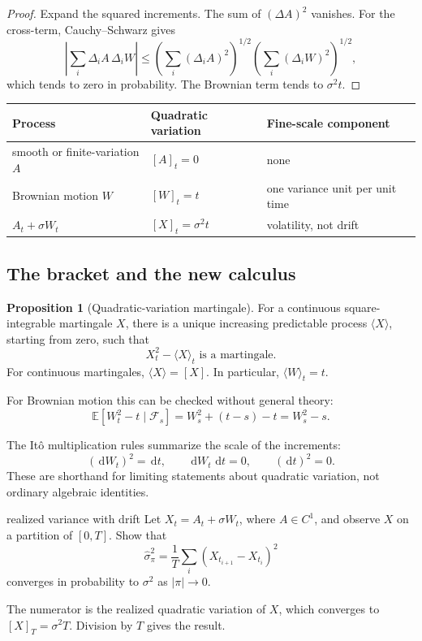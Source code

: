 \documentclass[10pt]{article}
\newcommand{\E}{\mathbb E}
\newcommand{\1}{\mathbf 1}
\newcommand{\cF}{\mathcal F}
\newcommand{\dd}{\,\mathrm d}
\theoremstyle{definition}
\newtheorem{proposition}[definition]{Proposition}
\begin{document}
\begin{proof}
Expand the squared increments. The sum of \((\Delta A)^2\) vanishes. For the
cross-term, Cauchy--Schwarz gives
\[
\left|\sum_i\Delta_iA\,\Delta_iW\right|
\leq
\left(\sum_i(\Delta_iA)^2\right)^{1/2}
\left(\sum_i(\Delta_iW)^2\right)^{1/2},
\]
which tends to zero in probability. The Brownian term tends to
\(\sigma^2t\).
\end{proof}

\begin{center}
\begin{tabular}{lll}
\toprule
Process & Quadratic variation & Fine-scale component \\
\midrule
smooth or finite-variation \(A\) & \([A]_t=0\) & none \\
Brownian motion \(W\) & \([W]_t=t\) & one variance unit per unit time \\
\(A_t+\sigma W_t\) & \([X]_t=\sigma^2t\) & volatility, not drift \\
\bottomrule
\end{tabular}
\end{center}

\subsection{The bracket and the new calculus}

\begin{proposition}[Quadratic-variation martingale]
For a continuous square-integrable martingale \(X\), there is a unique
increasing predictable process \(\langle X\rangle\), starting from zero, such
that
\[
\boxed{X_t^2-\langle X\rangle_t\text{ is a martingale}.}
\]
For continuous martingales, \(\langle X\rangle=[X]\). In particular,
\(\langle W\rangle_t=t\).
\end{proposition}

For Brownian motion this can be checked without general theory:
\[
\E[W_t^2-t\mid\cF_s]
=W_s^2+(t-s)-t
=W_s^2-s.
\]

The It\^o multiplication rules summarize the scale of the increments:
\[
(\dd W_t)^2=\dd t,
\qquad
\dd W_t\,\dd t=0,
\qquad
(\dd t)^2=0.
\]
These are shorthand for limiting statements about quadratic variation, not
ordinary algebraic identities.

\begin{studentexercise}{realized variance with drift}
Let \(X_t=A_t+\sigma W_t\), where \(A\in C^1\), and observe \(X\) on a
partition of \([0,T]\). Show that
\[
\widehat\sigma_\pi^2
=\frac1T\sum_i(X_{t_{i+1}}-X_{t_i})^2
\]
converges in probability to \(\sigma^2\) as \(|\pi|\to0\).
\end{studentexercise}
\begin{shortsolution}
The numerator is the realized quadratic variation of \(X\), which converges
to \([X]_T=\sigma^2T\). Division by \(T\) gives the result.
\end{shortsolution}
\end{document}
